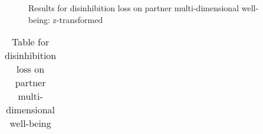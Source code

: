 \documentclass[
  singlecolumn]{article}
\begin{document}
\begin{figure}


\caption{\label{fig-results-disinhibition-loss}Results for disinhibition
loss on partner multi-dimensional well-being: z-transformed}

\end{figure}%

\newpage{}

\begin{longtable}[]{@{}
  >{\raggedright\arraybackslash}p{}
  >{\raggedleft\arraybackslash}p{}
  >{\raggedleft\arraybackslash}p{}
  >{\raggedleft\arraybackslash}p{}
  >{\raggedleft\arraybackslash}p{}
  >{\raggedleft\arraybackslash}p{}@{}}

\caption{\label{tbl-results-disinhibition-loss}Table for disinhibition
loss on partner multi-dimensional well-being}

\tabularnewline


\end{longtable}
\end{document}
